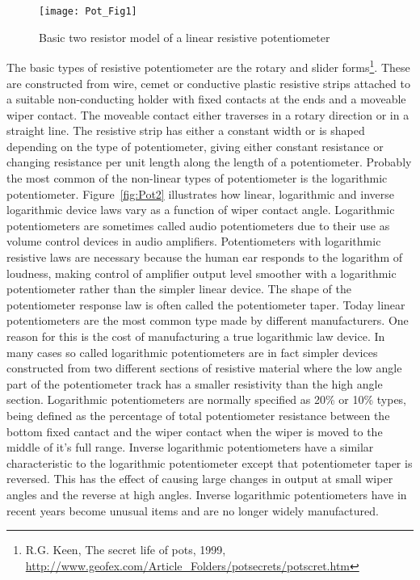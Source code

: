 \begin{figure} [h]
  \centering
  \texttt{[image: Pot\_Fig1]}
  \caption{Basic two resistor model of a linear resistive potentiometer}
  \label{fig:Pot1}
\end{figure} 

The basic types of resistive potentiometer are the rotary and slider
forms\footnote{R.G. Keen, The secret life of pots, 1999,
\url{http://www.geofex.com/Article_Folders/potsecrets/potscret.htm}
}. These are constructed from wire, cemet or conductive plastic
resistive strips attached to a suitable non-conducting holder with
fixed contacts at the ends and a moveable wiper contact. The moveable
contact either traverses in a rotary direction or in a straight
line. The resistive strip has either a constant width or is shaped
depending on the type of potentiometer, giving either constant
resistance or changing resistance per unit length along the length of
a potentiometer. Probably the most common of the non-linear types of
potentiometer is the logarithmic potentiometer. Figure~\ref{fig:Pot2}
illustrates how linear, logarithmic and inverse logarithmic device
laws vary as a function of wiper contact angle. Logarithmic
potentiometers are sometimes called audio potentiometers due to their
use as volume control devices in audio amplifiers. Potentiometers with
logarithmic resistive laws are necessary because the human ear
responds to the logarithm of loudness, making control of amplifier
output level smoother with a logarithmic potentiometer rather than the
simpler linear device. The shape of the potentiometer response law is
often called the potentiometer taper. Today linear potentiometers are
the most common type made by different manufacturers. One reason for
this is the cost of manufacturing a true logarithmic law device. In
many cases so called logarithmic potentiometers are in fact simpler
devices constructed from two different sections of resistive material
where the low angle part of the potentiometer track has a smaller
resistivity than the high angle section. Logarithmic potentiometers
are normally specified as 20\% or 10\% types, being defined as the
percentage of total potentiometer resistance between the bottom fixed
cantact and the wiper contact when the wiper is moved to the middle of
it's full range. Inverse logarithmic potentiometers have a similar
characteristic to the logarithmic potentiometer except that
potentiometer taper is reversed. This has the effect of causing large
changes in output at small wiper angles and the reverse at high
angles. Inverse logarithmic potentiometers have in recent years become
unusual items and are no longer widely manufactured.


